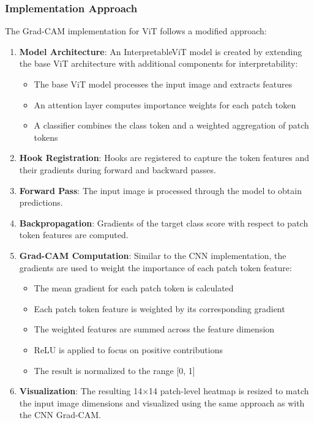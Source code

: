 \documentclass[a4paper,12pt]{article}
\begin{document}
\subsubsection{Implementation Approach}

The Grad-CAM implementation for ViT follows a modified approach:

\begin{enumerate}
    \item \textbf{Model Architecture}: An InterpretableViT model is created by extending the base ViT architecture with additional components for interpretability:
    \begin{itemize}
        \item The base ViT model processes the input image and extracts features
        \item An attention layer computes importance weights for each patch token
        \item A classifier combines the class token and a weighted aggregation of patch tokens
    \end{itemize}
    
    \item \textbf{Hook Registration}: Hooks are registered to capture the token features and their gradients during forward and backward passes.
    
    \item \textbf{Forward Pass}: The input image is processed through the model to obtain predictions.
    
    \item \textbf{Backpropagation}: Gradients of the target class score with respect to patch token features are computed.
    
    \item \textbf{Grad-CAM Computation}: Similar to the CNN implementation, the gradients are used to weight the importance of each patch token feature:
    \begin{itemize}
        \item The mean gradient for each patch token is calculated
        \item Each patch token feature is weighted by its corresponding gradient
        \item The weighted features are summed across the feature dimension
        \item ReLU is applied to focus on positive contributions
        \item The result is normalized to the range [0, 1]
    \end{itemize}
    
    \item \textbf{Visualization}: The resulting 14×14 patch-level heatmap is resized to match the input image dimensions and visualized using the same approach as with the CNN Grad-CAM.
\end{enumerate}
\end{document}
